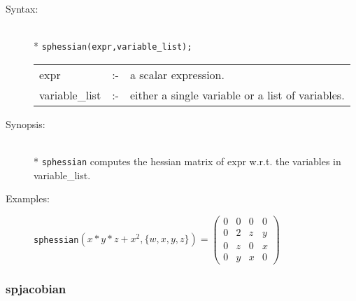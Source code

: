 \begin{description}
\item[Syntax:]\mbox{}\\*
 \texttt{sphessian(expr,variable\_list);}\\[2mm]
\begin{tabular}{l l l}
expr           &:-& a scalar expression. \\
variable\_list &:-& either a single variable or a list of variables.
\end{tabular}

\item[Synopsis:]\mbox{}\\*
                \texttt{sphessian} computes the hessian matrix of expr w.r.t.
                the variables in variable\_list.

\item[Examples:]
\hspace*{0.1in}
\texttt{sphessian}\((x*y*z+x^2,\{w,x,y,z\})  =
\begin{pmatrix} 0 & 0 & 0 & 0 \\ 0 & 2 & z & y \\ 0 & z & 0
& x \\ 0 & y & x & 0
\end{pmatrix}\)
\end{description}

\subsubsection{spjacobian}
\label{sparse:spjacobian}
\hypertarget{operator:SPJACOBIAN}{}

